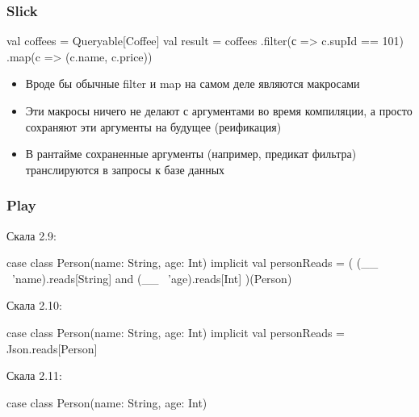 \documentclass[svgnames,hyperref={bookmarks=false}]{beamer}
\begin{document}
\begin{frame}[fragile]
\frametitle{}

\vskip40pt
\begin{center}
\end{center}
\end{frame}

\begin{frame}[fragile]
\frametitle{Slick}

\begin{semiverbatim}
val coffees = Queryable[Coffee]
val result = coffees
  .filter(с => c.supId == 101)
  .map(c => (c.name, c.price))
\end{semiverbatim}

\begin{itemize}
\item Вроде бы обычные filter и map на самом деле являются макросами
\item Эти макросы ничего не делают с аргументами во время компиляции, а просто сохраняют эти аргументы на будущее (реификация)
\item В рантайме сохраненные аргументы (например, предикат фильтра) транслируются в запросы к базе данных
\end{itemize}
\end{frame}

\begin{frame}[fragile]
\frametitle{Play}

Скала 2.9:
\begin{semiverbatim}
case class Person(name: String, age: Int)
implicit val personReads = (
  (__ \ 'name).reads[String] and
  (__ \ 'age).reads[Int]
)(Person)
\end{semiverbatim}

Скала 2.10:
\begin{semiverbatim}
case class Person(name: String, age: Int)
implicit val personReads = Json.reads[Person]
\end{semiverbatim}

Скала 2.11:
\begin{semiverbatim}
case class Person(name: String, age: Int)
\end{semiverbatim}
\end{frame}
\end{document}
